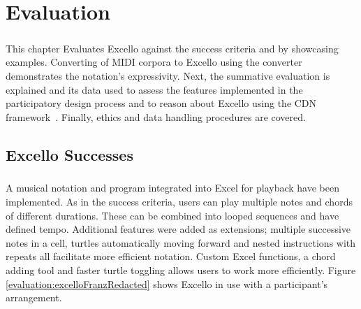 

\newcommand{\mycbox}[1]{\tikz{\path[draw=#1,fill=#1] (0,0) rectangle (0.3cm,0.3cm);}}

\chapter{Evaluation}

\paragraph{} This chapter Evaluates Excello against the success criteria and by showcasing examples. Converting of MIDI corpora to Excello using the converter demonstrates the notation's expressivity. Next, the summative evaluation is explained and its data used to assess the features implemented in the participatory design process and to reason about Excello using the CDN framework~\cite{blackwell:tutorial}. Finally, ethics and data handling procedures are covered.

\section{Excello Successes}

\paragraph{} A musical notation and program integrated into Excel for playback have been implemented. As in the success criteria, users can play multiple notes and chords of different durations. These can be combined into looped sequences and have defined tempo. Additional features were added as extensions; multiple successive notes in a cell, turtles automatically moving forward and nested instructions with repeats all facilitate more efficient notation. Custom Excel functions, a chord adding tool and faster turtle toggling allows users to work more efficiently. Figure \ref{evaluation:excelloFranzRedacted} shows Excello in use with a participant's arrangement.

